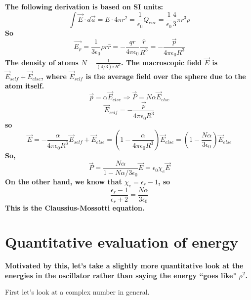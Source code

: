 \documentclass[]{revtex4}
\newcommand{\st}[1]{{\color{red}\bfseries #1}}
\begin{document}
  \st{
    The following derivation is based on SI units:
    \begin{equation*}
      \int \vec{E} \cdot d \vec{a} = E \cdot 4 \pi r^2 = \frac{1}{\epsilon_0} Q_{enc} = \frac{1}{\epsilon_0} \frac{4}{3} \pi r^3 \rho
    \end{equation*}
    So
    \begin{equation*}
      \vec{E_{\rho}} = \frac{1}{3 \epsilon_0} \rho r \hat{r} = - \frac{q r}{4 \pi \epsilon_0} \frac{\hat{r}}{R^3} = - \frac{\vec{p}}{4 \pi \epsilon_0 R^3}
    \end{equation*}
    The density of atoms $N = \frac{1}{(4/3)\pi R^3}$. The macroscopic field $\vec{E}$ is $\vec{E}_{self} + \vec{E}_{else}$, where $\vec{E}_{self}$ is the average field over the sphere due to the atom itself.
    \begin{equation*}
      \vec{p} = \alpha \vec{E}_{else} \Rightarrow \vec{P} = N \alpha \vec{E}_{else}
    \end{equation*}
    \begin{equation*}
      \vec{E}_{self} = - \frac{\vec{p}}{4 \pi \epsilon_0 R^3}
    \end{equation*}
    so
    \begin{equation*}
      \vec{E} = - \frac{\alpha}{4 \pi \epsilon_0 R^3} \vec{E}_{self} + \vec{E}_{else} = (1-\frac{\alpha}{4 \pi \epsilon_0 R^3}) \vec{E}_{else} = (1-\frac{N \alpha}{3 \epsilon_0}) \vec{E}_{else}
    \end{equation*}
    So,
    \begin{equation*}
      \vec{P} = \frac{N \alpha}{1 - N \alpha/3 \epsilon_0} \vec{E} = \epsilon_0 \chi_e \vec{E}
    \end{equation*}
    On the other hand, we know that $\chi_e = \epsilon_r - 1$, so
    \begin{equation*}
      \frac{\epsilon_r - 1}{\epsilon_r + 2} = \frac{N \alpha}{3 \epsilon_0}
    \end{equation*}
    This is the Claussius-Mossotti equation.
  }


\section*{Quantitative evaluation of energy}
\st{Motivated by this, let's take a slightly more quantitative look at the energies in the oscillator rather than saying the energy ``goes like" $\rho^2$.

First let's look at a complex number in general.}
\end{document}
